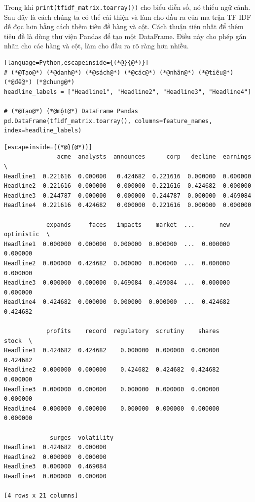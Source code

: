 Trong khi \texttt{print(tfidf\_matrix.toarray())} cho biểu diễn số, nó thiếu ngữ cảnh. Sau đây là cách chúng ta có thể cải thiện và làm cho đầu ra của ma trận TF-IDF dễ đọc hơn bằng cách thêm tiêu đề hàng và cột. Cách thuận tiện nhất để thêm tiêu đề là dùng thư viện Pandas để tạo một DataFrame. Điều này cho phép gán nhãn cho các hàng và cột, làm cho đầu ra rõ ràng hơn nhiều.

\begin{lstlisting}[language=Python,escapeinside={(*@}{@*)}]
# (*@Tạo@*) (*@danh@*) (*@sách@*) (*@các@*) (*@nhãn@*) (*@tiêu@*) (*@đề@*) (*@chung@*)
headline_labels = ["Headline1", "Headline2", "Headline3", "Headline4"]

# (*@Tạo@*) (*@một@*) DataFrame Pandas
pd.DataFrame(tfidf_matrix.toarray(), columns=feature_names, index=headline_labels)
\end{lstlisting}

\begin{lstlisting}[escapeinside={(*@}{@*)}]
               acme  analysts  announces      corp   decline  earnings  \
Headline1  0.221616  0.000000   0.424682  0.221616  0.000000  0.000000   
Headline2  0.221616  0.000000   0.000000  0.221616  0.424682  0.000000   
Headline3  0.244787  0.000000   0.000000  0.244787  0.000000  0.469084   
Headline4  0.221616  0.424682   0.000000  0.221616  0.000000  0.000000   

            expands     faces   impacts    market  ...       new  optimistic  \
Headline1  0.000000  0.000000  0.000000  0.000000  ...  0.000000    0.000000   
Headline2  0.000000  0.424682  0.000000  0.000000  ...  0.000000    0.000000   
Headline3  0.000000  0.000000  0.469084  0.469084  ...  0.000000    0.000000   
Headline4  0.424682  0.000000  0.000000  0.000000  ...  0.424682    0.424682   

            profits    record  regulatory  scrutiny    shares     stock  \
Headline1  0.424682  0.424682    0.000000  0.000000  0.000000  0.424682   
Headline2  0.000000  0.000000    0.424682  0.424682  0.424682  0.000000   
Headline3  0.000000  0.000000    0.000000  0.000000  0.000000  0.000000   
Headline4  0.000000  0.000000    0.000000  0.000000  0.000000  0.000000   

             surges  volatility  
Headline1  0.424682  0.000000  
Headline2  0.000000  0.000000  
Headline3  0.000000  0.469084  
Headline4  0.000000  0.000000  

[4 rows x 21 columns]
\end{lstlisting}

